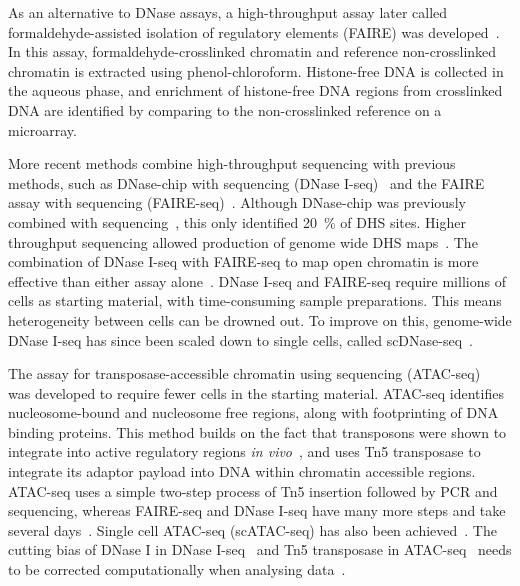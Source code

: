 \documentclass[../main.tex]{subfiles}
\begin{document}
As an alternative to DNase assays, a high\hyp{}throughput assay later called formaldehyde\hyp{}assisted isolation of regulatory elements (FAIRE) was developed~\autocite{nagyGenomewideDemarcationRNA2003}.
In this assay, formaldehyde\hyp{}crosslinked chromatin and reference non\hyp{}crosslinked chromatin is extracted using phenol\hyp{}chloroform.
Histone\hyp{}free DNA is collected in the aqueous phase, and enrichment of histone\hyp{}free DNA regions from crosslinked DNA are identified by comparing to the non\hyp{}crosslinked reference on a microarray.

More recent methods combine high\hyp{}throughput sequencing with previous methods, such as DNase-chip with sequencing (DNase I-seq)~\autocite{boyleHighResolutionMappingCharacterization2008} and the FAIRE assay with sequencing (FAIRE-seq)~\autocite{giresiFAIREFormaldehydeAssistedIsolation2007}.
Although DNase-chip was previously combined with sequencing~\autocite{crawfordGenomewideMappingDNase2006}, this only identified \SI{20}{\percent} of DHS sites. Higher throughput sequencing allowed production of genome wide DHS maps~\autocite{boyleHighResolutionMappingCharacterization2008}.
The combination of DNase I-seq with FAIRE-seq to map open chromatin is more effective than either assay alone~\autocite{songOpenChromatinDefined2011}.
DNase I-seq and FAIRE-seq require millions of cells as starting material, with time\hyp{}consuming sample preparations.
This means heterogeneity between cells can be drowned out.
To improve on this, genome\hyp{}wide DNase I-seq has since been scaled down to single cells, called scDNase-seq~\autocite{jinGenomewideDetectionDNase2015}.

The assay for transposase\hyp{}accessible chromatin using sequencing (ATAC\hyp{}seq)~\autocite{buenrostroTranspositionNativeChromatin2013} was developed to require fewer cells in the starting material.
ATAC\hyp{}seq identifies nucleosome\hyp{}bound and nucleosome free regions, along with footprinting of DNA binding proteins.
This method builds on the fact that transposons were shown to integrate into active regulatory regions \textit{in vivo}~\autocite{gangadharanDNATransposonHermes2010}, and uses Tn5 transposase to integrate its adaptor payload into DNA within chromatin accessible regions. ATAC\hyp{}seq uses a simple two\hyp{}step process of Tn5 insertion followed by PCR and sequencing, whereas FAIRE\hyp{}seq and DNase I\hyp{}seq have many more steps and take several days~\autocite{buenrostroTranspositionNativeChromatin2013}.
Single cell ATAC\hyp{}seq (scATAC\hyp{}seq) has also been achieved~\autocite{cusanovichMultiplexSinglecellProfiling2015,buenrostroSinglecellChromatinAccessibility2015}.
The cutting bias of DNase I in DNase I\hyp{}seq~\autocite{heRefinedDNaseseqProtocol2014} and Tn5 transposase in ATAC\hyp{}seq~\autocite{martinsUniversalCorrectionEnzymatic2018} needs to be corrected computationally when analysing data~\autocite{liuLongNoncodingRNA2019a}.
\end{document}

